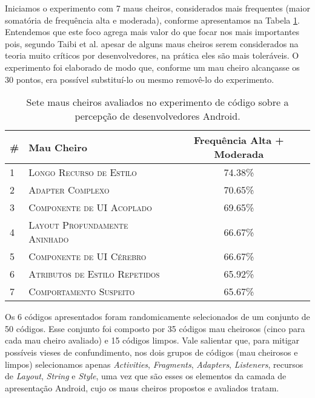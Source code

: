 Iniciamos o experimento com 7 maus cheiros, considerados mais frequentes (maior somatória de frequência alta e moderada), conforme apresentamos na Tabela \ref{tab:selected-smells}. Entendemos que este foco agrega mais valor do que focar nos mais importantes pois, segundo Taibi et al. \cite{Taibi:17} apesar de alguns maus cheiros serem considerados na teoria muito críticos por desenvolvedores, na prática eles são mais toleráveis. O experimento foi elaborado de modo que, conforme um mau cheiro alcançasse os 30 pontos, era possível substituí-lo ou mesmo removê-lo do experimento.



\begin{table}
\centering
\renewcommand*{\arraystretch}{1}
\footnotesize 
\caption{Sete maus cheiros avaliados no experimento de código sobre a percepção de desenvolvedores Android.}
\begin{tabular}{@{}lp{7cm}c@{}}
\toprule
\# & \multirow{1}{*}{\textbf{Mau Cheiro}} & \multirow{1}{*}{\textbf{Frequência Alta + Moderada}}  \\
\toprule
1 & \textsc{\small Longo Recurso de Estilo}          & 74.38\% \\
2 & \textsc{\small Adapter Complexo}                 & 70.65\% \\
3 & \textsc{\small Componente de UI Acoplado}        & 69.65\% \\
4 & \textsc{\small Layout Profundamente Aninhado}    & 66.67\% \\
5 & \textsc{\small Componente de UI Cérebro}         & 66.67\% \\
6 & \textsc{\small Atributos de Estilo Repetidos}    & 65.92\% \\
7 & \textsc{\small Comportamento Suspeito}           & 65.67\% \\
\bottomrule
\end{tabular}
\label{tab:selected-smells}
\end{table}


Os 6 códigos apresentados foram randomicamente selecionados de um conjunto de 50 códigos. Esse conjunto foi composto por 35 códigos mau cheirosos (cinco para cada mau cheiro avaliado) e 15 códigos limpos. Vale salientar que, para mitigar possíveis vieses de confundimento, nos dois grupos de códigos (mau cheirosos e limpos) selecionamos apenas \textit{Activities}, \textit{Fragments}, \textit{Adapters}, \textit{Listeners}, recursos de \textit{Layout}, \textit{String} e \textit{Style}, uma vez que são esses os elementos da camada de apresentação Android, cujo os maus cheiros propostos e avaliados tratam.

